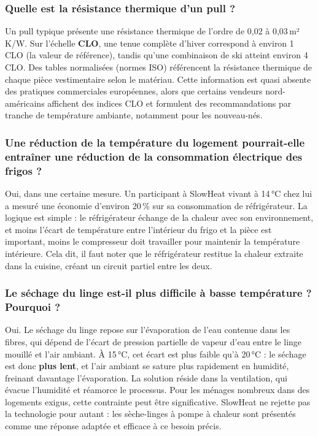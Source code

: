 \subsubsection{Quelle est la résistance thermique d'un pull ?}

Un pull typique présente une résistance thermique de l'ordre de 0,02 à 0,03\,m²\,K/W. Sur l'échelle \textbf{CLO}, une tenue complète d'hiver correspond à environ 1 CLO (la valeur de référence), tandis qu'une combinaison de ski atteint environ 4 CLO. Des tables normalisées (normes ISO) référencent la résistance thermique de chaque pièce vestimentaire selon le matériau. Cette information est quasi absente des pratiques commerciales européennes, alors que certains vendeurs nord-américains affichent des indices CLO et formulent des recommandations par tranche de température ambiante, notamment pour les nouveau-nés.

\subsubsection{Une réduction de la température du logement pourrait-elle entraîner une réduction de la consommation électrique des frigos ?}

Oui, dans une certaine mesure. Un participant à SlowHeat vivant à 14\,°C chez lui a mesuré une économie d'environ 20\,\% sur sa consommation de réfrigérateur. La logique est simple : le réfrigérateur échange de la chaleur avec son environnement, et moins l'écart de température entre l'intérieur du frigo et la pièce est important, moins le compresseur doit travailler pour maintenir la température intérieure. Cela dit, il faut noter que le réfrigérateur restitue la chaleur extraite dans la cuisine, créant un circuit partiel entre les deux.

\subsubsection{Le séchage du linge est-il plus difficile à basse température ? Pourquoi ?}

Oui. Le séchage du linge repose sur l'évaporation de l'eau contenue dans les fibres, qui dépend de l'écart de pression partielle de vapeur d'eau entre le linge mouillé et l'air ambiant. À 15\,°C, cet écart est plus faible qu'à 20\,°C : le séchage est donc \textbf{plus lent}, et l'air ambiant se sature plus rapidement en humidité, freinant davantage l'évaporation. La solution réside dans la ventilation, qui évacue l'humidité et réamorce le processus. Pour les ménages nombreux dans des logements exigus, cette contrainte peut être significative. SlowHeat ne rejette pas la technologie pour autant : les sèche-linges à pompe à chaleur sont présentés comme une réponse adaptée et efficace à ce besoin précis.

